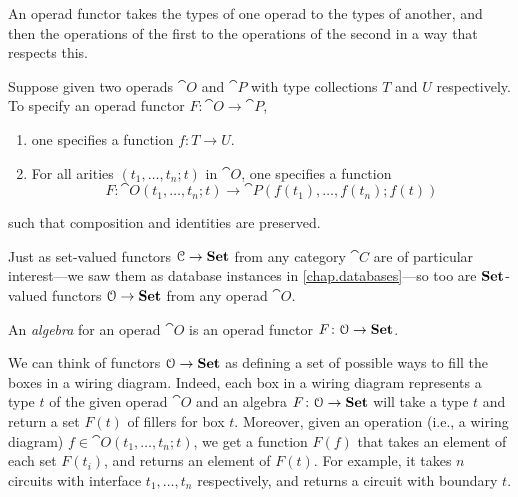 \documentclass[7Sketches]{subfiles}
\begin{document}
An operad functor takes the types of one operad to the types of another, and
then the operations of the first to the operations of the second in a way that
respects this. 
\begin{roughDef}%
Suppose given two operads $\cat O$ and $\cat P$ with type collections $T$ and $U$ respectively. To specify an
operad functor $F\colon \cat O \to \cat P$,
\begin{enumerate}[label=(\roman*)]
\item one specifies a function $f\colon T \to U$.
\item For all arities $(t_1,\dots,t_n;t)$ in $\cat O$, one specifies a function 
\[
F\colon \cat O(t_1,\dots,t_n;t) \to \cat P(f(t_1),\dots,f(t_n);f(t))
\]
\end{enumerate}
such that composition and identities are preserved.
\end{roughDef}

Just as set-valued functors $\mathcal{C}\to\mathbf{Set}$ from any category $\cat{C}$ are of particular
interest---we saw them as database instances in \cref{chap.databases}---so too are $\mathbf{Set}$-valued functors $\mathcal{O}\to\mathbf{Set}$ from any operad $\cat{O}$.%

\begin{definition}%
An \emph{algebra} for an operad $\cat O$ is an operad functor
$F\colon \mathcal{O} \to \mathbf{Set}$.
\end{definition}

We can think of functors $\mathcal{O}\to\mathbf{Set}$ as defining a set of possible ways to fill the
boxes in a wiring diagram. Indeed, each box in a wiring diagram represents a
type $t$ of the given operad $\cat O$ and an algebra $F\colon \mathcal{O} \to
\mathbf{Set}$ will take a type $t$ and return a set $F(t)$ of fillers for box $t$.  Moreover, given an
operation (i.e., a wiring diagram) $f\in \cat O(t_1,\dots,t_n;t)$, we get a
function $F(f)$ that takes an element of each set $F(t_i)$, and returns an element
of $F(t)$. For example, it takes $n$ circuits with interface
$t_1,\dots,t_n$ respectively, and returns a circuit with boundary $t$.
\end{document}
